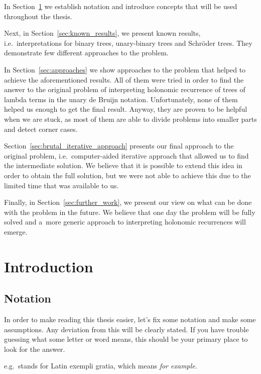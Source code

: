 \documentclass[final]{article}
\theoremstyle{definition}
\theoremstyle{definition}
\theoremstyle{remark}
\begin{document}
In Section~\ref{sec:introduction} we establish notation and introduce concepts that will be used throughout the thesis.

Next, in Section~\ref{sec:known_results}, we present known results, i.e.~interpretations for binary trees, unary-binary trees and Schröder trees. They demonstrate few different approaches to the problem.

In Section~\ref{sec:approaches} we show approaches to the problem that helped to achieve the aforementioned results. All of them were tried in order to find the answer to the original problem of interpreting holonomic recurrence of trees of lambda terms in the unary de Bruijn notation. Unfortunately, none of them helped us enough to get the final result. Anyway, they are proven to be helpful when we are stuck, as most of them are able to divide problems into smaller parts and detect corner cases.

Section~\ref{sec:brutal_iterative_approach} presents our final approach to the original problem, i.e.~computer-aided iterative approach that allowed us to find the intermediate solution. We believe that it is possible to extend this idea in order to obtain the full solution, but we were not able to achieve this due to the limited time that was available to us.

Finally, in Section~\ref{sec:further_work}, we present our view on what can be done with the problem in the future. We believe that one day the problem will be fully solved and a~more generic approach to interpreting holonomic recurrences will emerge.

\clearpage

\section{Introduction}%
\label{sec:introduction}

\subsection{Notation}%
\label{sub:notation}

In order to make reading this thesis easier, let's fix some notation and make some assumptions. Any deviation from this will be clearly stated. If you have trouble guessing what some letter or word means, this should be your primary place to look for the answer.

e.g.~stands for Latin exempli gratia, which means \textit{for example}.
\end{document}
